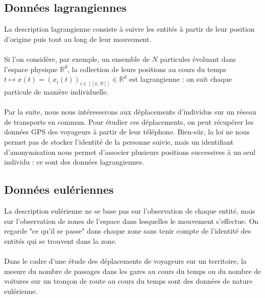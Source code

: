 \documentclass[12pt]{article}
\newcommand{\R}{\mathbb{R}}
\newcommand{\dcrochetg}{[\![}
\newcommand{\dcrochetd}{]\!]}
\begin{document}
\subsection{Données lagrangiennes}
La description lagrangienne consiste à suivre les entités à partir de leur position d'origine puis tout au long de leur mouvement.\\
\\
Si l'on considère, par exemple, un ensemble de $N$ particules évoluant dans l'espace physique $\mathbb{R}^d$, la collection de leurs positions au cours du temps $t \mapsto x(t) = (x_i(t))_{i \in \dcrochetg1;N\dcrochetd} \in \R^d $ est lagrangienne : on suit chaque particule de manière individuelle.\\
\\
Par la suite, nous nous intéresserons aux déplacements d'individus sur un réseau de transports en commun. Pour étudier ces déplacements, on peut récupérer les données GPS des voyageurs à partir de leur téléphone. Bien-sûr, la loi ne nous permet pas de stocker l'identité de la personne suivie, mais un identifiant d'anonymisation nous permet d'associer plusieurs positions successives à un seul individu : ce sont des données lagrangiennes.
\subsection{Données eulériennes}
La description eulérienne ne se base pas sur l'observation de chaque entité, mais sur l'observation de zones de l'espace dans lesquelles le mouvement s'effectue. On regarde "ce qu'il se passe" dans chaque zone sans tenir compte de l'identité des entités qui se trouvent dans la zone.\\
\\
Dans le cadre d'une étude des déplacements de voyageurs sur un territoire, la mesure du nombre de passages dans les gares au cours du temps ou du nombre de voitures sur un tronçon de route au cours du temps sont des données de nature eulérienne.
\end{document}
